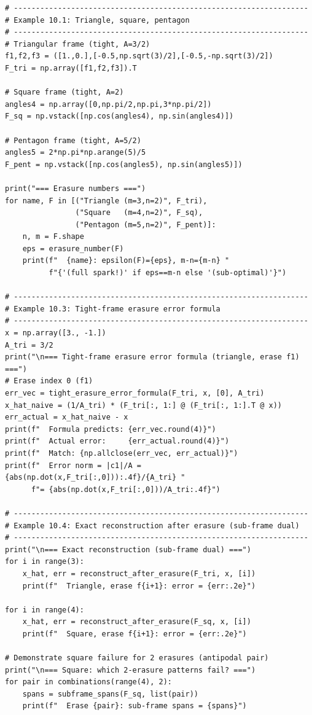 \begin{lstlisting}[caption={Erasure robustness tools in NumPy}]
# -------------------------------------------------------------------
# Example 10.1: Triangle, square, pentagon
# -------------------------------------------------------------------
# Triangular frame (tight, A=3/2)
f1,f2,f3 = ([1.,0.],[-0.5,np.sqrt(3)/2],[-0.5,-np.sqrt(3)/2])
F_tri = np.array([f1,f2,f3]).T

# Square frame (tight, A=2)
angles4 = np.array([0,np.pi/2,np.pi,3*np.pi/2])
F_sq = np.vstack([np.cos(angles4), np.sin(angles4)])

# Pentagon frame (tight, A=5/2)
angles5 = 2*np.pi*np.arange(5)/5
F_pent = np.vstack([np.cos(angles5), np.sin(angles5)])

print("=== Erasure numbers ===")
for name, F in [("Triangle (m=3,n=2)", F_tri),
                ("Square   (m=4,n=2)", F_sq),
                ("Pentagon (m=5,n=2)", F_pent)]:
    n, m = F.shape
    eps = erasure_number(F)
    print(f"  {name}: epsilon(F)={eps}, m-n={m-n} "
          f"{'(full spark!)' if eps==m-n else '(sub-optimal)'}")

# -------------------------------------------------------------------
# Example 10.3: Tight-frame erasure error formula
# -------------------------------------------------------------------
x = np.array([3., -1.])
A_tri = 3/2
print("\n=== Tight-frame erasure error formula (triangle, erase f1) ===")
# Erase index 0 (f1)
err_vec = tight_erasure_error_formula(F_tri, x, [0], A_tri)
x_hat_naive = (1/A_tri) * (F_tri[:, 1:] @ (F_tri[:, 1:].T @ x))
err_actual = x_hat_naive - x
print(f"  Formula predicts: {err_vec.round(4)}")
print(f"  Actual error:     {err_actual.round(4)}")
print(f"  Match: {np.allclose(err_vec, err_actual)}")
print(f"  Error norm = |c1|/A = {abs(np.dot(x,F_tri[:,0])):.4f}/{A_tri} "
      f"= {abs(np.dot(x,F_tri[:,0]))/A_tri:.4f}")

# -------------------------------------------------------------------
# Example 10.4: Exact reconstruction after erasure (sub-frame dual)
# -------------------------------------------------------------------
print("\n=== Exact reconstruction (sub-frame dual) ===")
for i in range(3):
    x_hat, err = reconstruct_after_erasure(F_tri, x, [i])
    print(f"  Triangle, erase f{i+1}: error = {err:.2e}")

for i in range(4):
    x_hat, err = reconstruct_after_erasure(F_sq, x, [i])
    print(f"  Square, erase f{i+1}: error = {err:.2e}")

# Demonstrate square failure for 2 erasures (antipodal pair)
print("\n=== Square: which 2-erasure patterns fail? ===")
for pair in combinations(range(4), 2):
    spans = subframe_spans(F_sq, list(pair))
    print(f"  Erase {pair}: sub-frame spans = {spans}")
\end{lstlisting}

